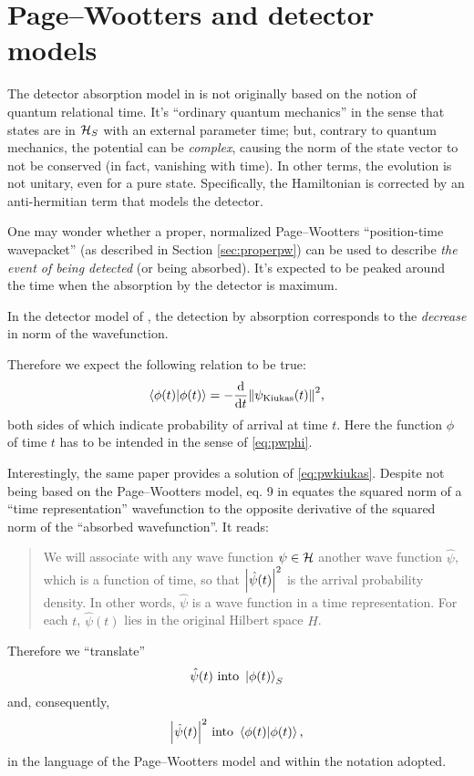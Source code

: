 \section{Page--Wootters and detector models}\label{sec:absorption+pw}

The detector absorption model in \cite{RuschhauptAbsorption} is not originally
based on the notion of quantum relational time. It's ``ordinary quantum mechanics''
in the sense that states are in $\mathcal{H}_S$ with an external parameter time;
but, contrary to quantum mechanics, the potential can be \emph{complex},
causing the norm of the state vector to not be conserved (in fact, vanishing with time).
In other terms, the evolution is not unitary, even for a pure state.
Specifically, the Hamiltonian is corrected by an anti-hermitian term
that models the detector.

One may wonder whether a proper, normalized Page--Wootters ``position-time wavepacket''
(as described in Section \ref{sec:properpw})
can be used to describe \emph{the event of being detected} (or being absorbed).
It's expected to be peaked around the time when the absorption by the detector is maximum.

\citereset
In the detector model of \cite{RuschhauptAbsorption}, the detection
by absorption
corresponds to the \emph{decrease} in norm of the wavefunction.

Therefore we expect the following relation to be true:
\begin{equation}\label{eq:pwkiukas}
  \braket{\phi(t)} = -\dv{t}\norm{\psi_{\text{Kiukas}}(t)}^2 \text{,}
\end{equation}
both sides of which indicate probability of arrival at time $t$.
Here the function $\phi$ of time $t$ has to be intended in the sense of
\eqref{eq:pwphi}.

\citereset
Interestingly, the same paper provides a solution of \eqref{eq:pwkiukas}.
Despite not being based on the Page--Wootters model, eq. 9 in \cite{RuschhauptAbsorption}
equates the squared norm of a ``time representation'' wavefunction
to the opposite derivative of the squared norm of the ``absorbed wavefunction''.
It reads:
\begin{quote}
  We will associate with any wave function $\psi \in \mathcal{H}$
  another wave function $\hat{\psi}$,
  which is a function of time, so that
  $\abs{\hat{\psi}(t)}^2$
  is the arrival probability density. In other words,
  $\hat{\psi}$ is a wave function in a time representation. For each
  $t$, $\hat{\psi}(t)$ lies in the original Hilbert space $H$.
\end{quote}
Therefore we ``translate''
$$\hat{\psi}(t) \text{ into } \ket{\phi(t)}_S$$
and, consequently,
$$\abs{\hat{\psi}(t)}^2 \text{ into } \braket{\phi(t)} \text{,}$$
in the language of the Page--Wootters model and within the notation
adopted.

